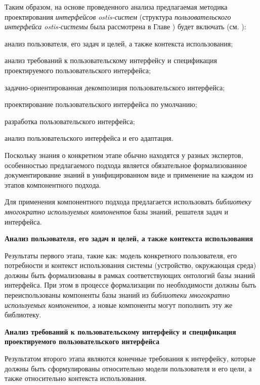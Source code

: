 {Таким образом, на основе проведенного анализа предлагаемая методика проектирования \textit{интерфейсов ostis-систем} (структура \textit{пользовательского интерфейса ostis-системы} была рассмотрена в Главе ) будет включать (см. ):
\begin{textitemize}
\item анализ пользователя, его задач и целей, а также контекста использования;
\item анализ требований к пользовательскому интерфейсу и спецификация проектируемого пользовательского интерфейса;
\item задачно-ориентированная декомпозиция пользовательского интерфейса;
\item проектирование пользовательского интерфейса по умолчанию;
\item разработка пользовательского интерфейса;
\item анализ пользовательского интерфейса и его адаптация.
\end{textitemize}

Поскольку знания о конкретном этапе обычно находятся у разных экспертов, особенностью предлагаемого подхода является обязательное формализованное документирование знаний в унифицированном виде и применение на каждом из этапов компонентного подхода.

Для применения компонентного подхода предлагается использовать \textit{библиотеку многократно используемых компонентов} базы знаний, решателя задач и интерфейса.

\textbf{Анализ пользователя, его задач и целей, а также контекста использования}

Результаты первого этапа, такие как: модель конкретного пользователя, его потребности и контекст использования системы (устройство, окружающая среда) должны быть формализованы в рамках соответствующих онтологий базы знаний интерфейса. 
При этом в процессе формализации по необходимости должны быть переиспользованы компоненты базы знаний из \textit{библиотеки многократно используемых компонентов}, а новые компоненты могут пополнить эту же библиотеку.

\textbf{Анализ требований к пользовательскому интерфейсу и спецификация проектируемого пользовательского интерфейса}

Результатом второго этапа являются конечные требования к интерфейсу, которые должны быть сформулированы относительно модели пользователя и его цели, а также относительно контекста использования.

}
